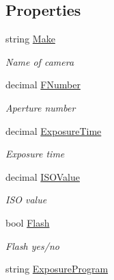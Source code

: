 \subsection*{Properties}
\begin{DoxyCompactItemize}
\item 
string \mbox{\hyperlink{class_pic_d_b_1_1_view_models_1_1_e_x_i_f_view_model_acfad266e0db926ba381790964a785f2a}{Make}}
\begin{DoxyCompactList}\small\item\em Name of camera \end{DoxyCompactList}\item 
decimal \mbox{\hyperlink{class_pic_d_b_1_1_view_models_1_1_e_x_i_f_view_model_a3ab4dcd2ddfa7b034de256e9e02f494d}{F\+Number}}
\begin{DoxyCompactList}\small\item\em Aperture number \end{DoxyCompactList}\item 
decimal \mbox{\hyperlink{class_pic_d_b_1_1_view_models_1_1_e_x_i_f_view_model_a1ca6e65e4ada6d96fa572bf588b1ee4d}{Exposure\+Time}}
\begin{DoxyCompactList}\small\item\em Exposure time \end{DoxyCompactList}\item 
decimal \mbox{\hyperlink{class_pic_d_b_1_1_view_models_1_1_e_x_i_f_view_model_a66631589f27175c3a114bfe76d12dd08}{I\+S\+O\+Value}}
\begin{DoxyCompactList}\small\item\em I\+SO value \end{DoxyCompactList}\item 
bool \mbox{\hyperlink{class_pic_d_b_1_1_view_models_1_1_e_x_i_f_view_model_a80e8ebae8c9817d8642c04bce533146e}{Flash}}
\begin{DoxyCompactList}\small\item\em Flash yes/no \end{DoxyCompactList}\item 
string \mbox{\hyperlink{class_pic_d_b_1_1_view_models_1_1_e_x_i_f_view_model_a12f7d7cb6622ea571c3210b51a1d14a5}{Exposure\+Program}}

\end{DoxyCompactItemize}
